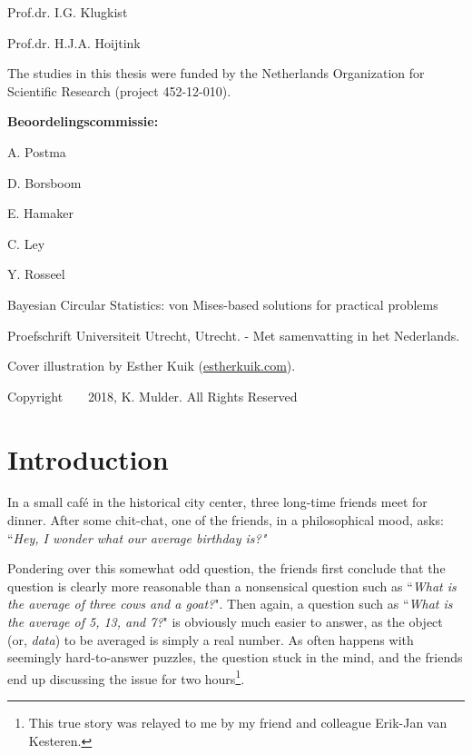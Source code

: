 \documentclass[12pt, a4paper]{book}\usepackage[]{graphicx}\usepackage{xcolor}
\begin{document}
Prof.dr. I.G. Klugkist

Prof.dr. H.J.A. Hoijtink


\vspace*{\fill}

\noindent The studies in this thesis were funded by the Netherlands Organization for Scientific Research (project 452-12-010).

\newpage


\pagestyle{plain}
\textbf{Beoordelingscommissie:}

A. Postma

D. Borsboom

E. Hamaker

C. Ley

Y. Rosseel




\vspace*{\fill}

\noindent Bayesian Circular Statistics: von Mises-based solutions for practical problems

Proefschrift Universiteit Utrecht, Utrecht. - Met samenvatting in het Nederlands.



Cover illustration by Esther Kuik (\href{http://estherkuik.com/}{estherkuik.com}).

Copyright ~ \textcopyright ~ 2018, K. Mulder. All Rights Reserved


\newpage


\tableofcontents



\chapter{Introduction}
\label{intro}

In a small caf\'e in the historical city center, three long-time friends meet for dinner. After some chit-chat, one of the friends, in a philosophical mood, asks: ``\textit{Hey, I wonder what our average birthday is?"}

Pondering over this somewhat odd question, the friends first conclude that the question is clearly more reasonable than a nonsensical question such as ``\textit{What is the average of three cows and a goat?}". Then again, a question such as ``\textit{What is the average of 5, 13, and 7?}" is obviously much easier to answer, as the object (or, \textit{data}) to be averaged is simply a real number. As often happens with seemingly hard-to-answer puzzles, the question stuck in the mind, and the friends end up discussing the issue for two hours\footnote{This true story was relayed to me by my friend and colleague Erik-Jan van Kesteren.}.
\end{document}
